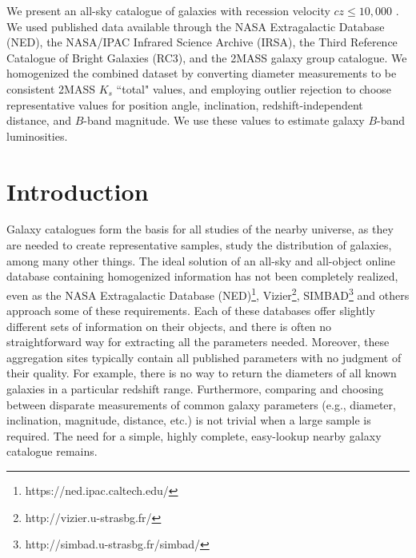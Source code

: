 \begin{chabstract}
We present an all-sky catalogue of galaxies with recession velocity $cz \leq 10,000$ \kms. We used published data available through the NASA Extragalactic Database (NED), the NASA/IPAC Infrared Science Archive (IRSA), the Third Reference Catalogue of Bright Galaxies (RC3), and the \cite{tully2015} 2MASS galaxy group catalogue. We homogenized the combined dataset by converting diameter measurements to be consistent 2MASS $K_s$ ``total" values, and employing outlier rejection to choose representative values for position angle, inclination, redshift-independent distance, and $B$-band magnitude. We use these values to estimate galaxy $B$-band luminosities.


\end{chabstract}

\cleardoublepage



\section{Introduction}

Galaxy catalogues form the basis for all studies of the nearby universe, as they are needed to create representative samples, study the distribution of galaxies, among many other things. The ideal solution of an all-sky and all-object online database containing homogenized information has not been completely realized, even as the NASA Extragalactic Database (NED)\footnote{https://ned.ipac.caltech.edu/}, Vizier\footnote{http://vizier.u-strasbg.fr/}, SIMBAD\footnote{http://simbad.u-strasbg.fr/simbad/} and others approach some of these requirements. Each of these databases offer slightly different sets of information on their objects, and there is often no straightforward way for extracting all the parameters needed. Moreover, these aggregation sites typically contain all published parameters with no judgment of their quality. For example, there is no way to return the diameters of all known galaxies in a particular redshift range. Furthermore, comparing and choosing between disparate measurements of common galaxy parameters (e.g., diameter, inclination, magnitude, distance, etc.) is not trivial when a large sample is required. The need for a simple, highly complete, easy-lookup nearby galaxy catalogue remains.

